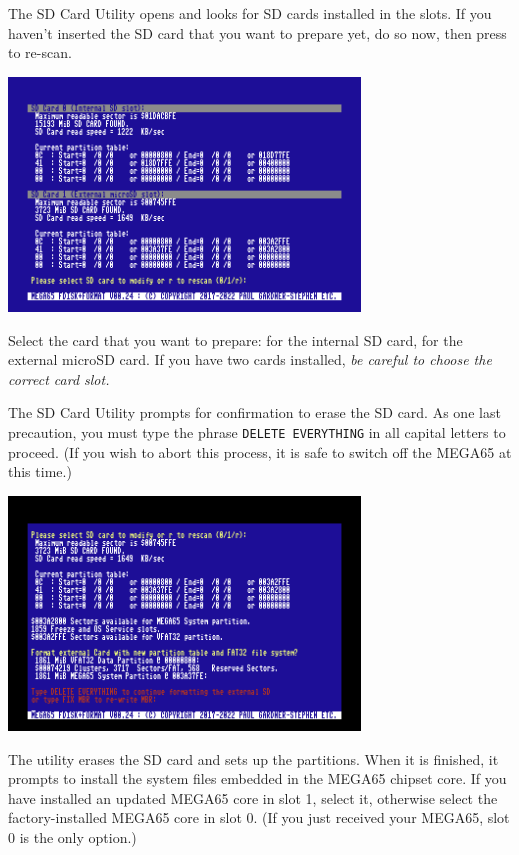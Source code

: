 The SD Card Utility opens and looks for SD cards installed in the slots. If you haven't inserted the SD card that you want to prepare yet, do so now, then press  to re-scan.

\begin{center}
  \includegraphics[width=0.7\textwidth]{images/ss-m65fdisk-busselect.png}
\end{center}

Select the card that you want to prepare:  for the internal SD card,  for the external microSD card. If you have two cards installed, {\em be careful to choose the correct card slot.}

The SD Card Utility prompts for confirmation to erase the SD card. As one last precaution, you must type the phrase {\tt DELETE EVERYTHING} in all capital letters to proceed. (If you wish to abort this process, it is safe to switch off the MEGA65 at this time.)

\begin{center}
  \includegraphics[width=0.7\textwidth]{images/ss-m65fdisk-typesomething.png}
\end{center}

The utility erases the SD card and sets up the partitions. When it is finished, it prompts to install the system files embedded in the MEGA65 chipset core. If you have installed an updated MEGA65 core in slot 1, select it, otherwise select the factory-installed MEGA65 core in slot 0. (If you just received your MEGA65, slot 0 is the only option.)

